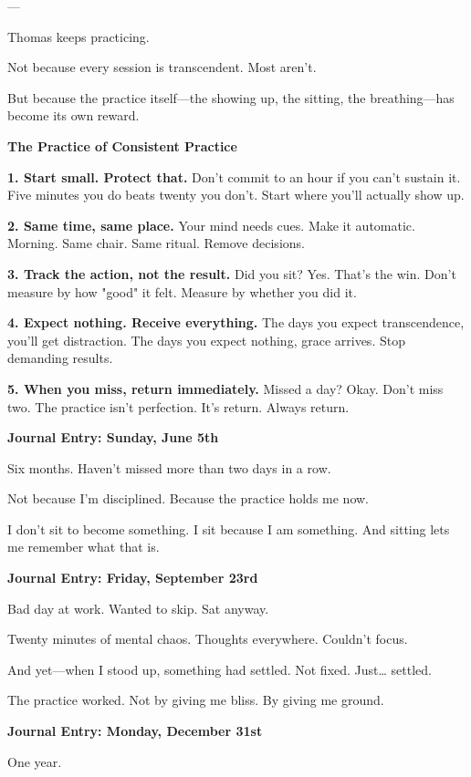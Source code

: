 \documentclass[11pt,twoside]{book}
\begin{document}
---

Thomas keeps practicing.

Not because every session is transcendent. Most aren't.

But because the practice itself—the showing up, the sitting, the breathing—has become its own reward.

\begin{practicebox}
\textbf{The Practice of Consistent Practice}

\textbf{1. Start small. Protect that.} Don't commit to an hour if you can't sustain it. Five minutes you do beats twenty you don't. Start where you'll actually show up.

\textbf{2. Same time, same place.} Your mind needs cues. Make it automatic. Morning. Same chair. Same ritual. Remove decisions.

\textbf{3. Track the action, not the result.} Did you sit? Yes. That's the win. Don't measure by how "good" it felt. Measure by whether you did it.

\textbf{4. Expect nothing. Receive everything.} The days you expect transcendence, you'll get distraction. The days you expect nothing, grace arrives. Stop demanding results.

\textbf{5. When you miss, return immediately.} Missed a day? Okay. Don't miss two. The practice isn't perfection. It's return. Always return.
\end{practicebox}

\textbf{Journal Entry: Sunday, June 5th}

Six months. Haven't missed more than two days in a row.

Not because I'm disciplined. Because the practice holds me now.

I don't sit to become something. I sit because I am something. And sitting lets me remember what that is.

\textbf{Journal Entry: Friday, September 23rd}

Bad day at work. Wanted to skip. Sat anyway.

Twenty minutes of mental chaos. Thoughts everywhere. Couldn't focus.

And yet—when I stood up, something had settled. Not fixed. Just\ldots{} settled.

The practice worked. Not by giving me bliss. By giving me ground.

\textbf{Journal Entry: Monday, December 31st}

One year.
\end{document}
